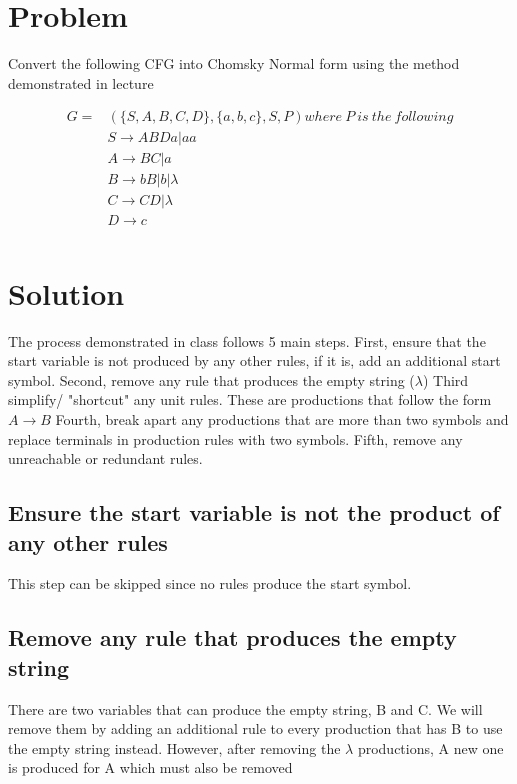 \documentclass{assignment-x}
\begin{document}
\maketitle
\pagebreak

\section{Problem}
Convert the following CFG into Chomsky Normal form using the method demonstrated in lecture

\begin{align*}
    G=&(\{S,A,B,C,D\},\{a,b,c\}, S, P) where\ P\ is\ the\ following\\
    &S \rightarrow ABDa|aa\\
    &A \rightarrow BC|a\\
    &B \rightarrow bB|b|\lambda\\
    &C \rightarrow CD|\lambda\\
    &D \rightarrow c\\
\end{align*}

\section{Solution}
The process demonstrated in class follows 5 main steps. 
First, ensure that the start variable is not produced by any other rules, if it is, add an additional start symbol.
Second, remove any rule that produces the empty string ($\lambda$)
Third simplify/ "shortcut" any unit rules.
These are productions that follow the form $A \rightarrow B$
Fourth, break apart any productions that are more than two symbols and replace terminals in production rules with two symbols.
Fifth, remove any unreachable or redundant rules.

\subsection{Ensure the start variable is not the product of any other rules}
This step can be skipped since no rules produce the start symbol.

\subsection{Remove any rule that produces the empty string}
There are two variables that can produce the empty string, B and C.
We will remove them by adding an additional rule to every production that has B to use the empty string instead.
However, after removing the $\lambda$ productions, A new one is produced for A which must also be removed
\end{document}
